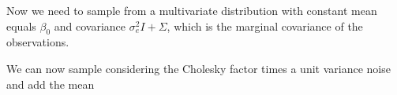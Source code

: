 Now we need to sample from a multivariate distribution 
with constant mean equals $\beta_0$ and 
covariance $\sigma^2_eI + \Sigma$, which is the 
marginal covariance of the observations. 
\begin{knitrout}
\color{fgcolor}\begin{kframe}
\begin{alltt}
 \hlkwb{<-} \hlstd{(}\hlopt{^}\hlstd{(}\hlopt{-}\hlopt{*}\hlopt{*}\hlopt{^} \hlopt{*}
                  \hlopt{*}\hlopt{/}
 \hlkwb{<-}  \hlkwb{<-} \hlopt{*} \hlopt{+} \hlopt{*}
\end{alltt}
\end{kframe}
\end{knitrout}
We can now sample considering the Cholesky factor times 
a unit variance noise and add the mean 
\begin{knitrout}
\color{fgcolor}\begin{kframe}
\begin{alltt}
 \hlkwb{<-}    \hlstd{(}\hlstd{)}
 \hlkwb{<-}  \hlopt{+} \hlstd{(} 
\end{alltt}
\end{kframe}
\end{knitrout}

